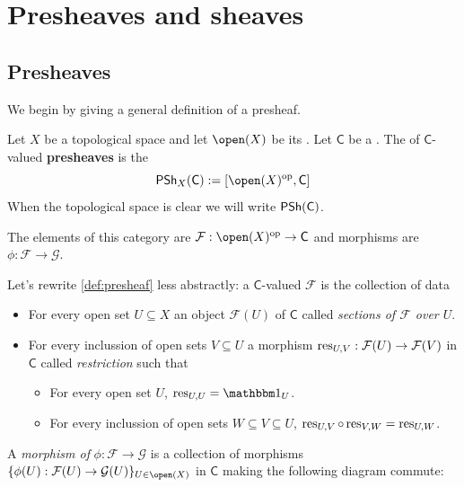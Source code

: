 \documentclass[../main.tex]{subfiles}
\begin{document}
\chapter{Presheaves and sheaves}

\section{Presheaves}
We begin by giving a general definition of a presheaf.
\begin{definition}[Presheaf] \label{def:presheaf}
  Let \(X\) be a topological space and let \(\open(X)\) be its .
  Let \(\mathsf{C}\) be a .
  The  of \(\mathsf{C}\)-valued \textbf{presheaves} is the 
  \begin{equation*}
    \PSh_{X}(\mathsf{C}) := [\open(X)^{\op}, \mathsf{C}]
  \end{equation*}
  When the topological space is clear we will write \(\mathsf{PSh}(\mathsf{C})\).

  The elements of this category are  \(\mathcal{F}: \open(X)^{\op} \to \mathsf{C}\) and morphisms are  \(\phi: \mathcal{F} \to \mathcal{G}\).
\end{definition}

Let's rewrite \autoref{def:presheaf} less abstractly: a \(\mathsf{C}\)-valued  \(\mathcal{F}\) is the collection of data
\begin{itemize}
  \item For every open set \(U \subseteq X\) an object \(\mathcal{F}(U)\) of \(\mathsf{C}\) called \textit{sections of \(\mathcal{F}\) over \(U\)}.
  \item For every inclussion of open sets \(V \subseteq U\) a morphism \(\operatorname{res}_{U, V}: \mathcal{F}(U) \to \mathcal{F}(V)\) in \(\mathsf{C}\) called \textit{restriction} such that
        \begin{itemize}
          \item For every open set \(U\), \(\res_{U, U} = \id_{U}\).
          \item For every inclussion of open sets \(W \subseteq V \subseteq U\), \(\operatorname{res}_{U, V} \circ \operatorname{res}_{V, W} = \operatorname{res}_{U, W}\).
        \end{itemize}
\end{itemize}

A \textit{morphism of } \(\phi: \mathcal{F} \to \mathcal{G}\) is a collection of morphisms \(\{\phi(U): \mathcal{F}(U) \to \mathcal{G}(U)\}_{U \in \open(X)}\) in \(\mathsf{C}\) making the following diagram commute:
\begin{center}
\end{center}
\end{document}
